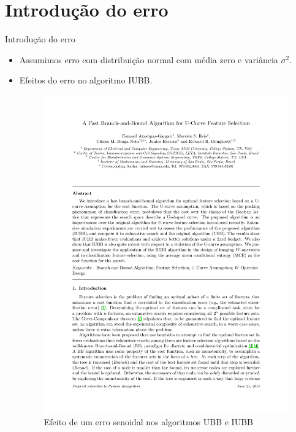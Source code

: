 \documentclass{beamer}
\begin{document}
\section{Introdução do erro}
\begin{frame}{Introdução do erro}
    \begin{itemize}
        \item{Assumimos erro com distribuição normal com média zero e
            variância $\sigma^2$.}
        \item{Efeitos do erro no algoritmo IUBB.}
        \begin{figure}[h]
            \includegraphics[page=15, clip, trim=12cm 10.7cm 3cm 12cm,
                scale=.8]{IUBB_submit}
            \caption{Efeito de um erro senoidal nos algoritmos UBB e 
        IUBB \protect\cite{iubb}}
        \end{figure}
    \end{itemize}
\end{frame}
\end{document}
